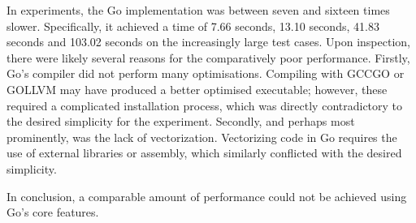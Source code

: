 \documentclass[twocolumn, a4paper]{article}
\begin{document}
In experiments, the Go implementation was between seven and sixteen times slower.
Specifically, it achieved a time of 7.66 seconds, 13.10 seconds, 41.83 seconds and 103.02 seconds on the increasingly large test cases.
Upon inspection, there were likely several reasons for the comparatively poor performance.
Firstly, Go's compiler did not perform many optimisations.
Compiling with GCCGO or GOLLVM may have produced a better optimised executable; however, these required a complicated installation process, which was directly contradictory to the desired simplicity for the experiment.
Secondly, and perhaps most prominently, was the lack of vectorization.
Vectorizing code in Go requires the use of external libraries or assembly, which similarly conflicted with the desired simplicity.

In conclusion, a comparable amount of performance could not be achieved using Go's core features.

\clearpage

\onecolumn{
  \printbibliography
}
\end{document}
